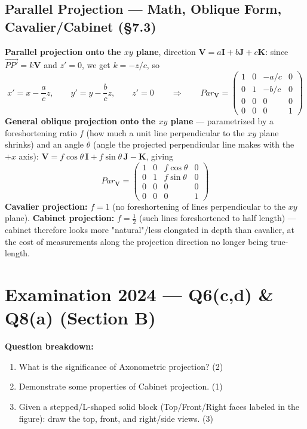 \documentclass[12pt, a4paper]{article}
\newenvironment{solutionbox}{\begin{mdframed}[style=solutionframe]}{\end{mdframed}}
\newenvironment{answerbox}{\begin{mdframed}[style=answerframe]}{\end{mdframed}}
\begin{document}
\subsection{Parallel Projection --- Math, Oblique Form, Cavalier/Cabinet (\S7.3)}
\begin{answerbox}
\textbf{Parallel projection onto the $xy$ plane}, direction $\mathbf V=a\mathbf I+b\mathbf J+c\mathbf K$: since $\overrightarrow{PP'}=k\mathbf V$ and $z'=0$, we get $k=-z/c$, so
$$x'=x-\frac{a}{c}z, \qquad y'=y-\frac{b}{c}z, \qquad z'=0 \qquad\Rightarrow\qquad Par_{\mathbf V}=\begin{pmatrix}1&0&-a/c&0\\0&1&-b/c&0\\0&0&0&0\\0&0&0&1\end{pmatrix}$$
\textbf{General oblique projection onto the $xy$ plane} --- parametrized by a foreshortening ratio $f$ (how much a unit line perpendicular to the $xy$ plane shrinks) and an angle $\theta$ (angle the projected perpendicular line makes with the $+x$ axis): $\mathbf V=f\cos\theta\,\mathbf I + f\sin\theta\,\mathbf J - \mathbf K$, giving
$$Par_{\mathbf V} = \begin{pmatrix}1&0&f\cos\theta&0\\0&1&f\sin\theta&0\\0&0&0&0\\0&0&0&1\end{pmatrix}$$
\textbf{Cavalier projection:} $f=1$ (no foreshortening of lines perpendicular to the $xy$ plane). \textbf{Cabinet projection:} $f=\tfrac12$ (such lines foreshortened to half length) --- cabinet therefore looks more "natural"/less elongated in depth than cavalier, at the cost of measurements along the projection direction no longer being true-length.
\end{answerbox}

\section{Examination 2024 --- Q6(c,d) \& Q8(a) (Section B)}
\begin{solutionbox}
\textbf{Question breakdown:}
\begin{enumerate}[noitemsep]
  \item[Q6(c)] What is the significance of Axonometric projection? (2)
  \item[Q6(d)] Demonstrate some properties of Cabinet projection. (1)
  \item[Q8(a)] Given a stepped/L-shaped solid block (Top/Front/Right faces labeled in the figure): draw the top, front, and right/side views. (3)
\end{enumerate}
\end{solutionbox}
\end{document}
